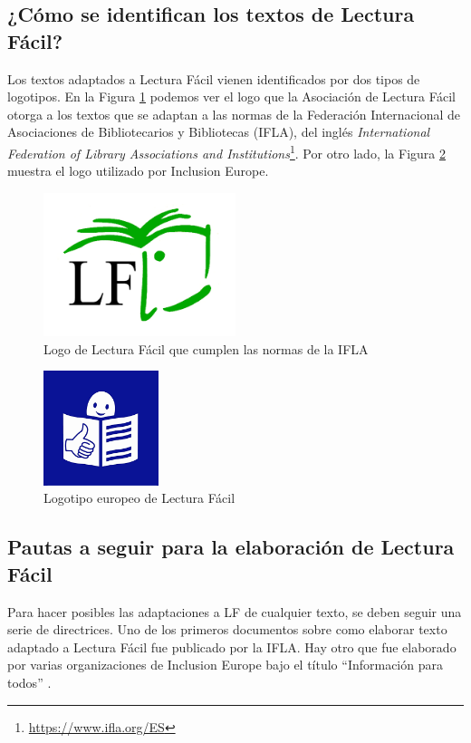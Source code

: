 \subsection{¿Cómo se identifican los textos de Lectura Fácil?}
Los textos adaptados a Lectura Fácil vienen identificados por dos tipos de logotipos. En la Figura \ref{fig:IFLA} podemos ver el logo que la Asociación de Lectura Fácil otorga a los textos que se adaptan a las normas de la Federación Internacional de Asociaciones de Bibliotecarios y Bibliotecas (IFLA), del inglés \textit{International Federation of Library Associations and Institutions}\footnote{\href{https://www.ifla.org/ES}{https://www.ifla.org/ES}}. Por otro lado, la Figura  \ref{fig:logoEuropeo} muestra el logo utilizado por Inclusion Europe.
\begin{figure}[htb]
\centering
	\includegraphics[width=0.5\textwidth]{Imagenes/Logos/indice}
	\caption{Logo de Lectura Fácil que cumplen las normas de la IFLA}
	\label{fig:IFLA}
\end{figure} 
\begin{figure}[htb]
	\centering
	\includegraphics[width=0.3\textwidth]{Imagenes/Logos/indice2}
	\caption{Logotipo europeo de Lectura Fácil}
	\label{fig:logoEuropeo}
\end{figure} 

\subsection{Pautas a seguir para la elaboración de Lectura Fácil}
Para hacer posibles las adaptaciones a LF de cualquier texto, se deben seguir una serie de directrices. Uno de los primeros documentos sobre como elaborar texto adaptado a Lectura Fácil fue publicado por la IFLA. Hay otro que fue elaborado por varias organizaciones de Inclusion Europe bajo el título ``Información para todos'' \citep{InformacionParaTodos}.


